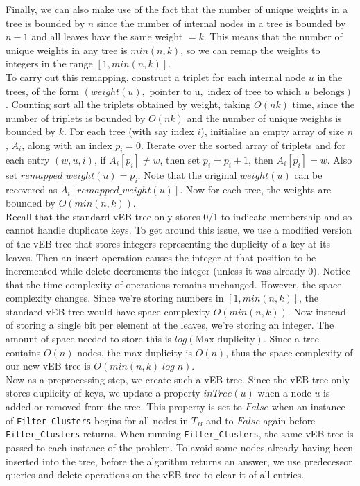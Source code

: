 \documentclass[a4paper]{article}
\begin{document}
    Finally, we can also make use of the fact that the number of unique weights in a tree is bounded by $n$ since the number of internal nodes in a tree is bounded by $n - 1$ and all leaves have the same weight $= k$. This means that the number of unique weights in any tree is $min(n, k)$, so we can remap the weights to integers in the range $[1, min(n, k)]$.\\

    To carry out this remapping, construct a triplet for each internal node $u$ in the trees, of the form $(weight(u), \text{ pointer to u}, \text{ index of tree to which }u\text{ belongs})$. Counting sort all the triplets obtained by weight, taking $O(nk)$ time, since the number of triplets is bounded by $O(nk)$ and the number of unique weights is bounded by $k$. For each tree (with say index $i$), initialise an empty array of size $n$, $A_i$, along with an index $p_i = 0$. Iterate over the sorted array of triplets and for each entry $(w, u, i)$, if $A_i[p_i] \neq w$, then set $p_i = p_i + 1$, then $A_i[p_i] = w$. Also set $remapped\_weight(u) = p_i$. Note that the original $weight(u)$ can be recovered as $A_i[remapped\_weight(u)]$. Now for each tree, the weights are bounded by $O(min(n, k))$.\\

    Recall that the standard vEB tree only stores 0/1 to indicate membership and so cannot handle duplicate keys. To get around this issue, we use a modified version of the vEB tree that stores integers representing the duplicity of a key at its leaves. Then an insert operation causes the integer at that position to be incremented while delete decrements the integer (unless it was already $0$). Notice that the time complexity of operations remains unchanged. However, the space complexity changes. Since we're storing numbers in $[1, min(n, k)]$, the standard vEB tree would have space complexity $O(min(n, k))$. Now instead of storing a single bit per element at the leaves, we're storing an integer. The amount of space needed to store this is $log(\text{Max duplicity})$. Since a tree contains $O(n)$ nodes, the max duplicity is $O(n)$, thus the space complexity of our new vEB tree is $O(min(n, k)\;log\;n)$.\\

    Now as a preprocessing step, we create such a vEB tree. Since the vEB tree only stores duplicity of keys, we update a property $inTree(u)$ when a node $u$ is added or removed from the tree. This property is set to $False$ when an instance of \texttt{Filter\_Clusters} begins for all nodes in $T_B$ and to $False$ again before \texttt{Filter\_Clusters} returns. When running \texttt{Filter\_Clusters}, the same vEB tree is passed to each instance of the problem. To avoid some nodes already having been inserted into the tree, before the algorithm returns an answer, we use predecessor queries and delete operations on the vEB tree to clear it of all entries.\\
\end{document}
